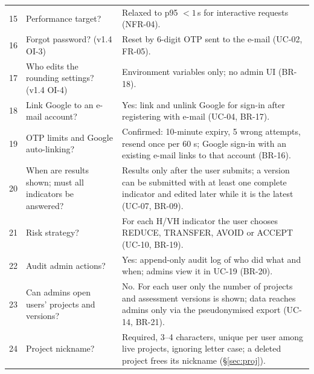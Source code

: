 \documentclass[11pt,a4paper]{article}
\begin{document}
\begin{longtable}{@{}l R{5.2cm} R{8.6cm}@{}}
15 & Performance target? & Relaxed to p95 $< 1$\,s for interactive requests (NFR-04). \\
16 & Forgot password? (v1.4 OI-3) & Reset by 6-digit OTP sent to the e-mail (UC-02, FR-05). \\
17 & Who edits the rounding settings? (v1.4 OI-4) & Environment variables only; no admin UI (BR-18). \\
18 & Link Google to an e-mail account? & Yes: link and unlink Google for sign-in after registering with e-mail (UC-04, BR-17). \\
19 & OTP limits and Google auto-linking? & Confirmed: 10-minute expiry, 5 wrong attempts, resend once per 60 s; Google sign-in with an existing e-mail links to that account (BR-16). \\
20 & When are results shown; must all indicators be answered? & Results only after the user submits; a version can be submitted with at least one complete indicator and edited later while it is the latest (UC-07, BR-09). \\
21 & Risk strategy? & For each H/VH indicator the user chooses REDUCE, TRANSFER, AVOID or ACCEPT (UC-10, BR-19). \\
22 & Audit admin actions? & Yes: append-only audit log of who did what and when; admins view it in UC-19 (BR-20). \\
23 & Can admins open users' projects and versions? & No. For each user only the number of projects and assessment versions is shown; data reaches admins only via the pseudonymised export (UC-14, BR-21). \\
24 & Project nickname? & Required, 3--4 characters, unique per user among live projects, ignoring letter case; a deleted project frees its nickname (\S\ref{sec:proj}). \\
\bottomrule
\end{longtable}
\end{document}
